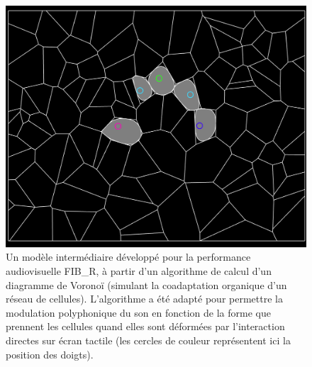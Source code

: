 

\begin{figure}[!htbp]
	\captionsetup{format=plain}
	\includegraphics[width=\textwidth]{gfx/04_algorithms/FIBR-Voronoi.png}
	\caption[Utilisation d'un diagramme de Voronoï dans FIB\_R]{Un modèle intermédiaire développé pour la performance audiovisuelle FIB\_R, à partir d'un algorithme de calcul d'un diagramme de Voronoï (simulant la coadaptation organique d'un réseau de cellules). L'algorithme a été adapté pour permettre la modulation polyphonique du son en fonction de la forme que prennent les cellules quand elles sont déformées par l'interaction directes sur écran tactile (les cercles de couleur représentent ici la position des doigts).}
	\label{fig:algorithms:FIBR-voronoi}
\end{figure}




